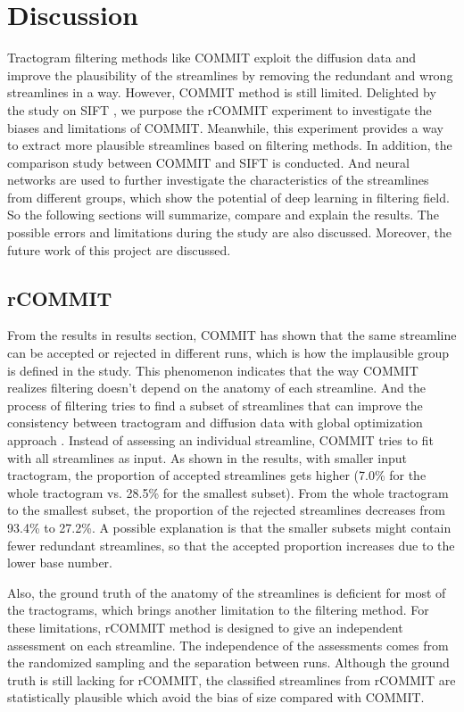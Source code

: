\chapter{Discussion}
Tractogram filtering methods like COMMIT exploit the diffusion data and improve the plausibility of 
the streamlines by removing the redundant and wrong streamlines in a way. 
However, COMMIT method is still limited. Delighted by the study on SIFT \cite{hainAssessingStreamlinePlausibility2022}, 
we purpose the rCOMMIT experiment to 
investigate the biases and limitations of COMMIT. Meanwhile, this experiment provides a way 
to extract more plausible streamlines based on filtering methods. 
In addition, the comparison study between COMMIT and SIFT is conducted. 
And neural networks are used to further investigate the characteristics of the streamlines from 
different groups, which show the potential of deep learning in filtering field. 
So the following sections will summarize, compare and explain the results. 
The possible errors and limitations during 
the study are also discussed. Moreover, the future work of this project are discussed.

\section{rCOMMIT}
From the results in results section, COMMIT has shown that the same streamline can be accepted or rejected in different runs, which is 
how the implausible group is defined in the study. This phenomenon indicates that the way COMMIT realizes filtering doesn't depend
on the anatomy of each streamline. And the process of filtering tries to find a subset of streamlines that can improve 
the consistency between tractogram and diffusion data with global optimization approach \cite{hainAssessingStreamlinePlausibility2022}.
Instead of assessing an individual streamline, COMMIT tries to fit with all streamlines as input. 
As shown in the results, with smaller input tractogram, the proportion of accepted streamlines gets higher 
(7.0\% for the whole tractogram vs. 28.5\% for the smallest subset). From the whole tractogram to the smallest subset, the proportion of 
the rejected streamlines decreases from  93.4\% to 27.2\%. 
A possible explanation is that the smaller subsets might contain fewer redundant streamlines, so that the accepted proportion increases
due to the lower base number. 

Also, the ground truth of the anatomy of the streamlines is deficient for most of the tractograms, 
which brings another limitation to the filtering method. For these limitations, rCOMMIT method is designed to give an independent
assessment on each streamline. The independence of the assessments comes from the randomized sampling and the separation between runs.  
Although the ground truth is still lacking for rCOMMIT, the classified streamlines from rCOMMIT are statistically plausible which avoid 
the bias of size compared with COMMIT. 


